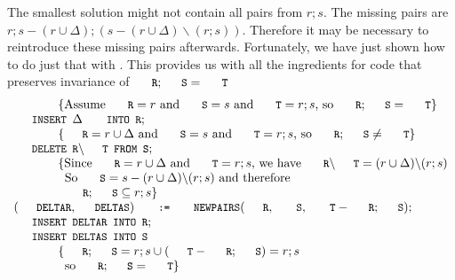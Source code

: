 \documentclass{svproc}
\begin{document}
	The smallest solution might not contain all pairs from $r;s$.
	The missing pairs are $r;s-(r\cup\Delta);(s-(r\cup \Delta)\backslash(r;s))$.
	Therefore it may be necessary to reintroduce these missing pairs afterwards.
	Fortunately, we have just shown how to do just that with .
	This provides us with all the ingredients for code that preserves invariance of $\code{R};\code{S}=\code{T}$
\[\begin{array}{l}
\hspace{0.5in}\{\text{Assume }\code{R}=r\text{ and }\code{S}=s\text{ and }\code{T}=r;s\text{, so }\code{R};\code{S}=\code{T}\}\\
\code{INSERT }\Delta\code{ INTO R};\\
\hspace{0.5in}\{\code{R}=r\cup\Delta\text{ and }\code{S}=s\text{ and }\code{T}=r;s\text{, so }\code{R};\code{S}\neq\code{T}\}\\
\code{DELETE R}\backslash\code{T FROM S};\\
\hspace{0.5in}\{\text{Since }\code{R}=r\cup\Delta\text{ and }\code{T}=r;s\text{, we have }\code{R}\backslash\code{T}=(r\cup \Delta)\backslash(r;s)\\
\hspace{0.575in}\text{So }\code{S}=s-(r\cup \Delta)\backslash(r;s)\text{ and therefore}\\
\hspace{0.575in}\code{R};\code{S}\subs r;s\}\\
(\code{DELTAR},\code{DELTAS})\code{ := }\code{NEWPAIRS}(\code{R},\ \code{S},\ \code{T}-\code{R};\code{S});\\
\code{INSERT DELTAR INTO R};\\
\code{INSERT DELTAS INTO S}\\
\hspace{0.5in}\{\code{R};\code{S}=r;s\cup(\code{T}-\code{R};\code{S})=r;s\\
\hspace{0.575in}\text{so }\code{R};\code{S}=\code{T}\}
\end{array}\]
\end{document}

